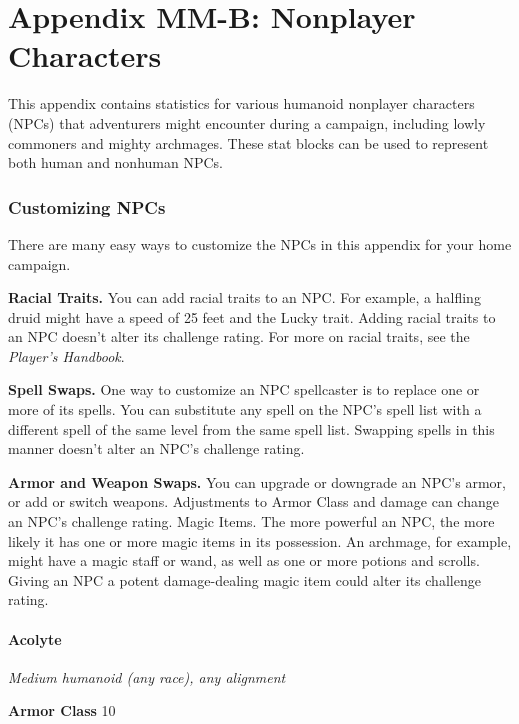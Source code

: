 \documentclass[
]{article}
\date{}
\begin{document}
\hypertarget{appendix-mm-b-nonplayer-characters}{%
\section{Appendix MM-B: Nonplayer
Characters}\label{appendix-mm-b-nonplayer-characters}}

This appendix contains statistics for various humanoid nonplayer
characters (NPCs) that adventurers might encounter during a campaign,
including lowly commoners and mighty archmages. These stat blocks can be
used to represent both human and nonhuman NPCs.

\hypertarget{customizing-npcs}{%
\subsubsection{Customizing NPCs}\label{customizing-npcs}}

There are many easy ways to customize the NPCs in this appendix for your
home campaign.

\textbf{Racial Traits.} You can add racial traits to an NPC. For
example, a halfling druid might have a speed of 25 feet and the Lucky
trait. Adding racial traits to an NPC doesn't alter its challenge
rating. For more on racial traits, see the \emph{Player's Handbook}.

\textbf{Spell Swaps.} One way to customize an NPC spellcaster is to
replace one or more of its spells. You can substitute any spell on the
NPC's spell list with a different spell of the same level from the same
spell list. Swapping spells in this manner doesn't alter an NPC's
challenge rating.

\textbf{Armor and Weapon Swaps.} You can upgrade or downgrade an NPC's
armor, or add or switch weapons. Adjustments to Armor Class and damage
can change an NPC's challenge rating. Magic Items. The more powerful an
NPC, the more likely it has one or more magic items in its possession.
An archmage, for example, might have a magic staff or wand, as well as
one or more potions and scrolls. Giving an NPC a potent damage-dealing
magic item could alter its challenge rating.

\hypertarget{acolyte}{%
\paragraph{Acolyte}\label{acolyte}}

\emph{Medium humanoid (any race), any alignment}

\textbf{Armor Class} 10
\end{document}
